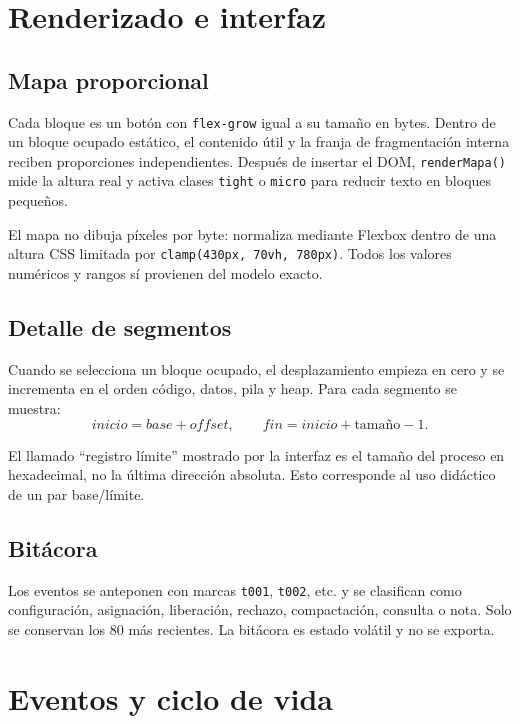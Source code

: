 \documentclass[11pt,a4paper]{article}
\newcommand{\funcion}[1]{\texttt{#1()}}
\begin{document}
\section{Renderizado e interfaz}

\subsection{Mapa proporcional}

Cada bloque es un botón con \texttt{flex-grow} igual a su tamaño en bytes. Dentro
de un bloque ocupado estático, el contenido útil y la franja de fragmentación
interna reciben proporciones independientes. Después de insertar el DOM,
\funcion{renderMapa} mide la altura real y activa clases \texttt{tight} o
\texttt{micro} para reducir texto en bloques pequeños.

El mapa no dibuja píxeles por byte: normaliza mediante Flexbox dentro de una altura
CSS limitada por \texttt{clamp(430px, 70vh, 780px)}. Todos los valores numéricos y
rangos sí provienen del modelo exacto.

\subsection{Detalle de segmentos}

Cuando se selecciona un bloque ocupado, el desplazamiento empieza en cero y se
incrementa en el orden código, datos, pila y heap. Para cada segmento se muestra:
\[
  inicio=base+offset,\qquad fin=inicio+\text{tamaño}-1.
\]

El llamado ``registro límite'' mostrado por la interfaz es el tamaño del proceso en
hexadecimal, no la última dirección absoluta. Esto corresponde al uso didáctico de
un par base/límite.

\subsection{Bitácora}

Los eventos se anteponen con marcas \texttt{t001}, \texttt{t002}, etc. y se
clasifican como configuración, asignación, liberación, rechazo, compactación,
consulta o nota. Solo se conservan los 80 más recientes. La bitácora es estado
volátil y no se exporta.

\section{Eventos y ciclo de vida}
\end{document}
